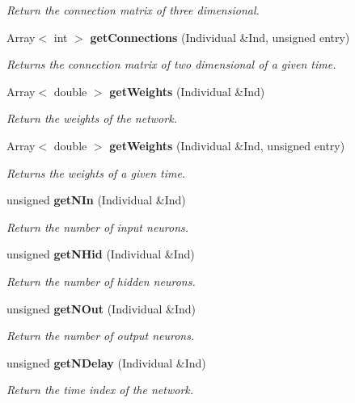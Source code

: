 \begin{CompactItemize}
\begin{CompactList}\small\item\em Return the connection matrix of three dimensional.\item\end{CompactList}\item 
Array$<$ int $>$ {\bf get\-Connections} (Individual \&Ind, unsigned entry)
\begin{CompactList}\small\item\em Returns the connection matrix of two dimensional of a given time.\item\end{CompactList}\item 
Array$<$ double $>$ {\bf get\-Weights} (Individual \&Ind)
\begin{CompactList}\small\item\em Return the weights of the network.\item\end{CompactList}\item 
Array$<$ double $>$ {\bf get\-Weights} (Individual \&Ind, unsigned entry)
\begin{CompactList}\small\item\em Returns the weights of a given time.\item\end{CompactList}\item 
unsigned {\bf get\-NIn} (Individual \&Ind)
\begin{CompactList}\small\item\em Return the number of input neurons.\item\end{CompactList}\item 
unsigned {\bf get\-NHid} (Individual \&Ind)
\begin{CompactList}\small\item\em Return the number of hidden neurons.\item\end{CompactList}\item 
unsigned {\bf get\-NOut} (Individual \&Ind)
\begin{CompactList}\small\item\em Return the number of output neurons.\item\end{CompactList}\item 
unsigned {\bf get\-NDelay} (Individual \&Ind)
\begin{CompactList}\small\item\em Return the time index of the network.\item\end{CompactList}\item 

\end{CompactItemize}
